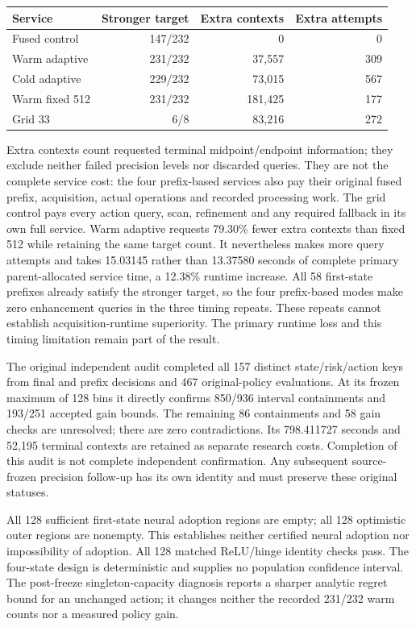 \begin{center}\small
\begin{tabular}{lrrr}
\hline
Service & Stronger target & Extra contexts & Extra attempts\\
\hline
Fused control & 147/232 & 0 & 0\\
Warm adaptive & 231/232 & 37,557 & 309\\
Cold adaptive & 229/232 & 73,015 & 567\\
Warm fixed 512 & 231/232 & 181,425 & 177\\
Grid 33 & 6/8 & 83,216 & 272\\
\hline
\end{tabular}
\end{center}

Extra contexts count requested terminal midpoint/endpoint information;
they exclude neither failed precision levels nor discarded queries. They
are not the complete service cost: the four prefix-based services also pay
their original fused prefix, acquisition, actual operations and recorded
processing work. The grid control pays every action query, scan, refinement
and any required fallback in its own full service.
Warm adaptive requests 79.30\% fewer extra contexts than fixed 512 while
retaining the same target count. It nevertheless makes more query attempts
and takes 15.03145 rather than 13.37580 seconds of complete primary
parent-allocated service time, a 12.38\% runtime increase. All 58 first-state
prefixes already satisfy the stronger target, so the four prefix-based
modes make zero enhancement queries in the three timing repeats. These
repeats cannot establish acquisition-runtime superiority. The primary
runtime loss and this timing limitation remain part of the result.

The original independent audit completed all 157 distinct state/risk/action
keys from final and prefix decisions and 467 original-policy evaluations.
At its frozen maximum of
128 bins it directly confirms 850/936 interval containments and 193/251
accepted gain bounds. The remaining 86 containments and 58 gain checks
are unresolved; there are zero contradictions. Its 798.411727 seconds and
52,195 terminal contexts are retained as separate research costs.
Completion of this audit is not complete independent confirmation.
Any subsequent source-frozen precision follow-up has its own identity and
must preserve these original statuses.

All 128 sufficient first-state neural adoption regions are empty; all 128
optimistic outer regions are nonempty. This establishes neither certified
neural adoption nor impossibility of adoption. All 128 matched ReLU/hinge
identity checks pass. The four-state design is deterministic and supplies
no population confidence interval. The post-freeze singleton-capacity
diagnosis reports a sharper analytic regret bound for an unchanged action;
it changes neither the recorded 231/232 warm counts nor a measured policy gain.

